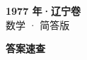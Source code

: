 \documentclass[zihao=-4, a4paper]{ctexart}
\begin{document}
\begin{center}
  {\Large\bfseries 1977 年·辽宁卷}\\[4pt]
  {\large 数学 · 简答版}
\end{center}
\medskip
{}

\clearpage
{}
\begin{center}{\Large\bfseries 答案速查}\end{center}
\medskip

\end{document}
